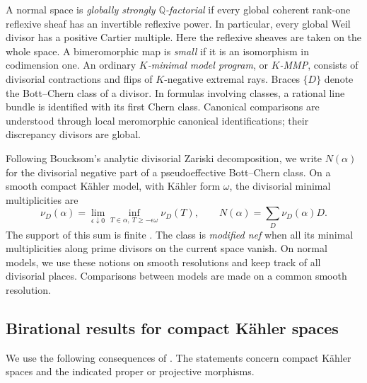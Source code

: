 \documentclass[11pt,a4paper]{article}
\theoremstyle{definition}\newtheorem{definition}[theorem]{Definition}
\theoremstyle{remark}\newtheorem*{remark}{Remark}
\newcommand{\Q}{\mathbb Q}\newcommand{\C}{\mathbb C}
\begin{document}
A normal space is \emph{globally strongly $\Q$-factorial} if every global
coherent rank-one reflexive sheaf has an invertible reflexive power.
In particular, every global Weil divisor has a positive Cartier multiple.
Here the reflexive sheaves are taken on the whole space.
A bimeromorphic map is \emph{small} if it is an isomorphism in codimension one.
An ordinary \emph{$K$-minimal model program}, or \emph{$K$-MMP}, consists
of divisorial contractions and flips of $K$-negative extremal rays.
Braces $\{D\}$ denote the Bott--Chern
class of a divisor. In formulas involving classes, a rational line bundle
is identified with its first Chern class.
Canonical comparisons are understood through local meromorphic
canonical identifications; their discrepancy divisors are global.

Following Boucksom's analytic divisorial Zariski decomposition,
we write $N(\alpha)$ for the divisorial negative part
of a pseudoeffective Bott--Chern class.
On a smooth compact Kähler model, with Kähler form
$\omega$, the divisorial minimal multiplicities are
\[
 \nu_D(\alpha)=\lim_{\epsilon\downarrow0}
 \inf_{T\in\alpha,\ T\ge-\epsilon\omega}\nu_D(T),
 \qquad N(\alpha)=\sum_D\nu_D(\alpha)D.
\]
The support of this sum is finite
\cite[Theorem~3.12\textup{(i)}]{Boucksom}.
The class is \emph{modified nef} when
all its minimal multiplicities along prime divisors on the current space
vanish. On normal models, we use these notions on smooth resolutions and
keep track of all divisorial places. Comparisons between models are made
on a common smooth resolution.

\subsection{Birational results for compact Kähler spaces}

We use the following consequences of \cite{OAI033,OAI034}. The
statements concern compact Kähler spaces and the indicated proper or
projective morphisms.
\end{document}
